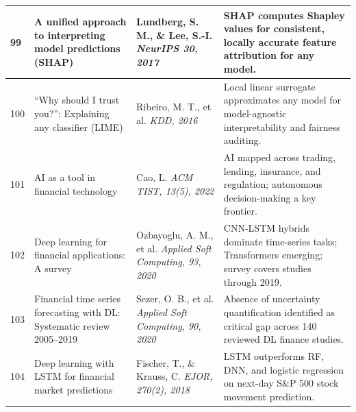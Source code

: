 \documentclass[12pt,a4paper,oneside]{report}
\theoremstyle{definition}
\theoremstyle{remark}
\begin{document}
\begin{center}
\begin{longtable}{|p{0.8cm}|p{4.2cm}|>{\raggedright\arraybackslash}p{4cm}|p{4.5cm}|}
99 & A unified approach to interpreting model predictions (SHAP) \cite{Lundberg2017SHAP} & Lundberg, S. M., \& Lee, S.-I. \newline\newline \textit{NeurIPS 30, 2017} & SHAP computes Shapley values for consistent, locally accurate feature attribution for any model. \\ \hline

100 & ``Why should I trust you?'': Explaining any classifier (LIME) \cite{Ribeiro2016LIME} & Ribeiro, M. T., et al. \newline\newline \textit{KDD, 2016} & Local linear surrogate approximates any model for model-agnostic interpretability and fairness auditing. \\ \hline

101 & AI as a tool in financial technology \cite{Cao2022AIQuantFinance} & Cao, L. \newline\newline \textit{ACM TIST, 13(5), 2022} & AI mapped across trading, lending, insurance, and regulation; autonomous decision-making a key frontier. \\ \hline

102 & Deep learning for financial applications: A survey \cite{Ozbayoglu2020DLFinance} & Ozbayoglu, A. M., et al. \newline\newline \textit{Applied Soft Computing, 93, 2020} & CNN-LSTM hybrids dominate time-series tasks; Transformers emerging; survey covers studies through 2019. \\ \hline

103 & Financial time series forecasting with DL: Systematic review 2005--2019 \cite{Sezer2020FTSFSurvey} & Sezer, O. B., et al. \newline\newline \textit{Applied Soft Computing, 90, 2020} & Absence of uncertainty quantification identified as critical gap across 140 reviewed DL finance studies. \\ \hline

104 & Deep learning with LSTM for financial market predictions \cite{Fischer2018LSTMStock} & Fischer, T., \& Krauss, C. \newline\newline \textit{EJOR, 270(2), 2018} & LSTM outperforms RF, DNN, and logistic regression on next-day S\&P 500 stock movement prediction. \\ \hline


\end{longtable}
\end{center}
\end{document}
